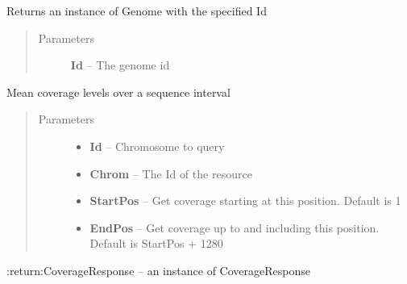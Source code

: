 \documentclass[letterpaper,10pt,english]{sphinxmanual}
\begin{document}
\begin{fulllineitems}
\begin{fulllineitems}
\end{fulllineitems}


\begin{fulllineitems}
\label{Available modules:BaseSpacePy.api.BaseSpaceAPI.BaseSpaceAPI.getGenomeById}
Returns an instance of Genome with the specified Id
\begin{quote}\begin{description}
\item[{Parameters}] \leavevmode
\textbf{Id} -- The genome id

\end{description}\end{quote}

\end{fulllineitems}


\begin{fulllineitems}
\label{Available modules:BaseSpacePy.api.BaseSpaceAPI.BaseSpaceAPI.getIntervalCoverage}
Mean coverage levels over a sequence interval
\begin{quote}\begin{description}
\item[{Parameters}] \leavevmode\begin{itemize}
\item {} 
\textbf{Id} -- Chromosome to query

\item {} 
\textbf{Chrom} -- The Id of the resource

\item {} 
\textbf{StartPos} -- Get coverage starting at this position. Default is 1

\item {} 
\textbf{EndPos} -- Get coverage up to and including this position. Default is StartPos + 1280

\end{itemize}

\end{description}\end{quote}

:return:CoverageResponse -- an instance of CoverageResponse


\end{fulllineitems}
\end{fulllineitems}
\end{document}
